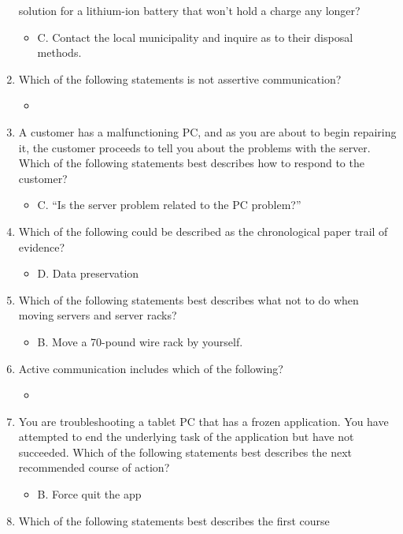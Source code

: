 \documentclass{article}
\begin{document}
\begin{enumerate}
solution for a lithium-ion battery that won’t hold a charge any longer?
    \begin{itemize}
        \item C. Contact the local municipality and inquire as to their
disposal methods.
    \end{itemize}
    \item Which of the following statements is not assertive communication?
    \begin{itemize}
        \item 
    \end{itemize}
    \item A customer has a malfunctioning PC, and as you are about to
begin repairing it, the customer proceeds to tell you about the
problems with the server. Which of the following statements best
describes how to respond to the customer?
    \begin{itemize}
        \item C. “Is the server problem related to the PC problem?”
    \end{itemize}
    \item Which of the following could be described as the chronological
paper trail of evidence?
    \begin{itemize}
        \item D. Data preservation
    \end{itemize}
    \item Which of the following statements best describes what not to do
when moving servers and server racks?
    \begin{itemize}
        \item B. Move a 70-pound wire rack by yourself.
    \end{itemize}
    \item Active communication includes which of the following?
    \begin{itemize}
        \item 
    \end{itemize}
    \item You are troubleshooting a tablet PC that has a frozen application.
You have attempted to end the underlying task of the application
but have not succeeded. Which of the following statements best
describes the next recommended course of action?
    \begin{itemize}
        \item B. Force quit the app
    \end{itemize}
    \item Which of the following statements best describes the first course

\end{enumerate}
\end{document}
